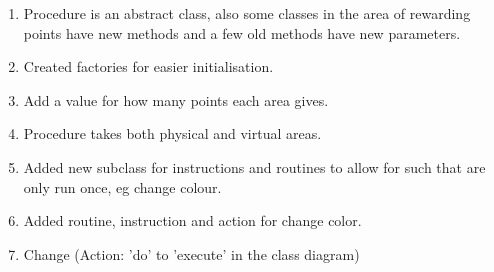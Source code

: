 \begin{enumerate}
    \item Procedure is an abstract class, also some classes in the area of rewarding points have new methods and a few old methods have new parameters.
    \item Created factories for easier initialisation.
    \item Add a value for how many points each area gives.
    \item Procedure takes both physical and virtual areas.
    \item Added new subclass for instructions and routines to allow for such that are only run once, eg change colour.
    \item Added routine, instruction and action for change color.
    \item Change (Action: 'do' to 'execute' in the class diagram)
\end{enumerate}